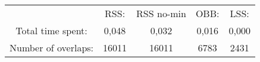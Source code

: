 \begin{tabular}{c|c|c|c|c}\\ 
& RSS: & RSS no-min & OBB: & LSS:\\ 
Total time spent: & 0,048 & 0,032 & 0,016 & 0,000\\ 
Number of overlaps: &16011 & 16011 & 6783 & 2431\\ 
\end{tabular}